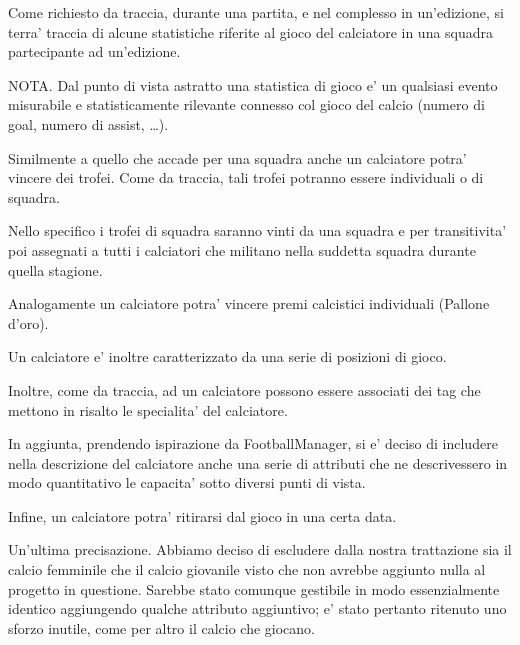 Come richiesto da traccia, durante una partita, e nel complesso in un'edizione, si terra' traccia
di alcune statistiche riferite al gioco del calciatore in una squadra partecipante ad
un'edizione.

NOTA. Dal punto di vista astratto una statistica di gioco e' un qualsiasi evento misurabile
e statisticamente rilevante connesso col gioco del calcio
(numero di goal, numero di assist, \dots).

Similmente a quello che accade per una squadra anche un calciatore potra' vincere dei trofei.
Come da traccia, tali trofei potranno essere individuali o di squadra.

Nello specifico i trofei di squadra saranno vinti da una squadra e per transitivita' poi
assegnati a tutti i calciatori che militano nella suddetta squadra durante quella stagione.

Analogamente un calciatore potra' vincere premi calcistici individuali (Pallone d'oro).

Un calciatore e' inoltre caratterizzato da una serie di posizioni di gioco.

Inoltre, come da traccia, ad un calciatore possono essere associati dei tag che mettono in
risalto le specialita' del calciatore.

In aggiunta, prendendo ispirazione da FootballManager, si e' deciso di includere nella
descrizione del calciatore anche una serie di attributi che ne descrivessero in modo quantitativo
le capacita' sotto diversi punti di vista.

Infine, un calciatore potra' ritirarsi dal gioco in una certa data.

\bigskip
\bigskip

Un'ultima precisazione. Abbiamo deciso di escludere dalla nostra trattazione sia il calcio
femminile che il calcio giovanile visto che non avrebbe aggiunto nulla al progetto in questione.
Sarebbe stato comunque gestibile in modo essenzialmente identico aggiungendo qualche attributo
aggiuntivo; e' stato pertanto ritenuto uno sforzo inutile, come per altro il calcio che giocano.